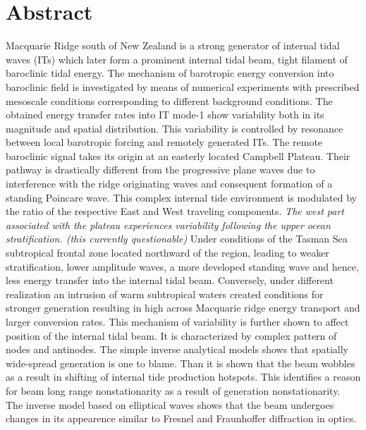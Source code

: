 \section*{Abstract}
Macquarie Ridge south of New Zealand is a strong generator of internal tidal waves (ITs) which later form a prominent internal tidal beam, tight filament of baroclinic tidal energy. The mechanism of barotropic energy conversion into baroclinic field is investigated by means of numerical experiments with prescribed mesoscale conditions corresponding to different background conditions. The obtained energy transfer rates into IT mode-1 show variability both in its magnitude and spatial distribution. This variability is controlled by resonance between local barotropic forcing and remotely generated ITs. The remote baroclinic signal takes its origin at an easterly located Campbell Plateau. Their pathway is drastically different from the progressive plane waves due to interference with the ridge originating waves and consequent formation of a standing Poincare wave. This complex internal tide environment is modulated by the ratio of the respective East and West traveling components. \textit{The west part associated with the plateau experiences variability following the upper ocean stratification. (this currently questionable)} Under conditions of the Tasman Sea subtropical frontal zone located northward of the region, leading to weaker stratification, lower amplitude waves, a more developed standing wave and hence, less energy transfer into the internal tidal beam. Conversely, under different realization an intrusion of warm subtropical waters created conditions for stronger generation resulting in high across Macquarie ridge energy transport and larger conversion rates. This mechanism of variability is further shown to affect position of the internal tidal beam. It is characterized by complex pattern of nodes and antinodes. The simple inverse analytical models shows that spatially wide-spread generation is one to blame. Than it is shown that the beam wobbles as a result in shifting of internal tide production hotspots. This identifies a reason for beam long range nonstationarity as a result of generation nonstationarity.\\
The inverse model based on elliptical waves shows that the beam undergoes changes in its appearence similar to Fresnel and Fraunhoffer diffraction in optics.

